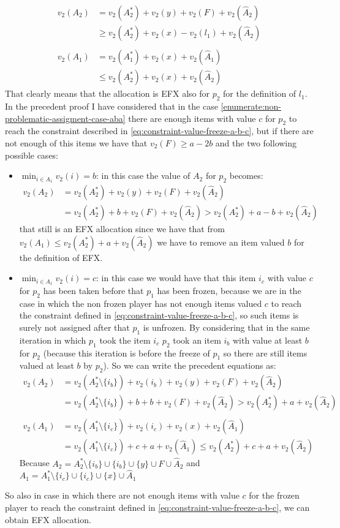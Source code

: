 \begin{align*}
    v_2(A_2) &=v_2(A_2^*) +  v_2(y) + v_2(F) + v_2(\hat A_2)\\
    & \ge  v_2(A_2^*) +  v_2(x) - v_2(l_1) + v_2(\hat A_2)\\\\
    v_2(A_1)& = v_2(A_1^*) + v_2(x) + v_2(\hat A_1)\\
    &\le v_2(A_2^*) + v_2(x) + v_2(\hat A_2)
\end{align*}
That clearly means that the allocation is EFX also for $p_2$ for the definition of $l_1$.
In the precedent proof I have considered that in the case \ref{enumerate:non-problematic-assigment-case-aba} there are enough items with value $c$ for $p_2$ to reach the constraint described in \ref{eq:constraint-value-freeze-a-b-c}, but if there are not enough of this items we have that $v_2(F) \ge a-2b$ and the two following possible cases:
\begin{itemize}
        \item $\min_{i\in A_1} v_2(i) = b$: in this case the value of $A_2$ for $p_2$ becomes:
        \begin{align*}
            v_2(A_2) &= v_2(A_2^*) + v_2(y) + v_2(F) + v_2(\hat A_2)\\
            &= v_2(A_2^*) + b + v_2(F) + v_2(\hat A_2) > v_2(A_2^*) + a-b + v_2(\hat A_2)
        \end{align*}
       that still is an EFX allocation since we have that from $v_2(A_1) \le v_2(A_2^*) + a + v_2(\hat A_2)$ we have to remove an item valued $b$ for the definition of EFX.
        \item $\min_{i\in A_1} v_2(i) = c$: in this case we would have that this item $i_c$ with value $c$ for $p_2$ has been taken before that $p_1$ has been frozen, because we are in the case in which the non frozen player has not enough items valued $c$ to reach the constraint defined in \ref{eq:constraint-value-freeze-a-b-c}, so such items is surely not assigned after that $p_1$ is unfrozen. By considering that in the same iteration in which $p_1$ took the item $i_c$ $p_2$ took an item $i_b$ with value at least $b$ for $p_2$ (because this iteration is before the freeze of $p_1$ so there are still items valued at least $b$ by $p_2$). So we can write the precedent equations as:
        \begin{align*}
            v_2(A_2) &= v_2(A_2^*\setminus{\{i_b\}}) + v_2(i_b) + v_2(y) + v_2(F) + v_2(\hat A_2) \\
            &= v_2(A_2^*\setminus{\{i_b\}}) + b + b + v_2(F) + v_2(\hat A_2)  > v_2(A_2^*) + a + v_2(\hat A_2)\\\\
            v_2(A_1) &= v_2(A_1^*\setminus{\{i_c\}}) + v_2(i_c)+ v_2(x) + v_2(\hat A_1)  \\
            &=v_2(A_1^*\setminus{\{i_c\}}) + c  + a + v_2(\hat A_1) \le v_2(A_2^*) + c + a + v_2(\hat A_2) 
        \end{align*}
        Because $A_2 = A_2^*\setminus{\{i_b\}} \cup \{i_b\} \cup \{y\} \cup F \cup \hat A_2$ and $A_1 = A_1^*\setminus{\{i_c\}} \cup \{i_c\} \cup \{x\} \cup \hat A_1$
\end{itemize}
So also in case in which there are not enough items with value $c$ for the frozen player to reach the constraint defined in \ref{eq:constraint-value-freeze-a-b-c}, we can obtain EFX allocation.